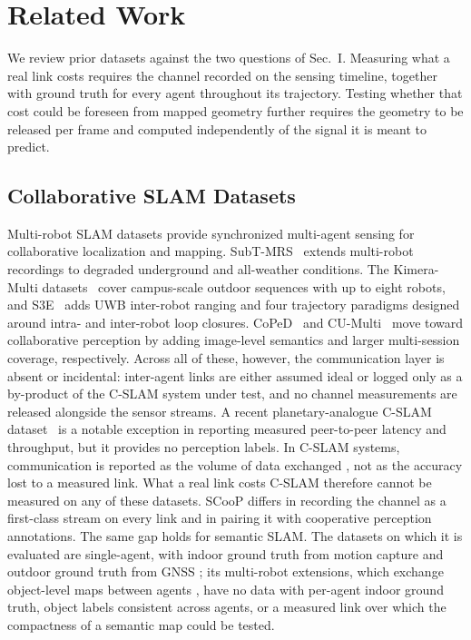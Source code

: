 \documentclass[conference]{IEEEtran}
\begin{document}
\section{Related Work}
\label{sec:related}
We review prior datasets against the two questions of Sec.~I. Measuring
what a real link costs requires the channel recorded on the sensing
timeline, together with ground truth for every agent throughout its
trajectory. Testing whether that cost could be foreseen from mapped
geometry further requires the geometry to be released per frame and
computed independently of the signal it is meant to predict.

\subsection{Collaborative SLAM Datasets}
Multi-robot SLAM datasets provide synchronized multi-agent sensing for
collaborative localization and mapping.
SubT-MRS~\cite{subtmrs} extends multi-robot recordings to degraded
underground and all-weather conditions. The Kimera-Multi
datasets~\cite{kimeramulti} cover campus-scale outdoor sequences
with up to eight robots, and S3E~\cite{s3e} adds UWB inter-robot
ranging and four trajectory paradigms designed around intra- and
inter-robot loop closures. CoPeD~\cite{coped} and
CU-Multi~\cite{cumulti} move toward collaborative perception by
adding image-level semantics and larger multi-session coverage,
respectively. Across all of these, however, the communication layer
is absent or incidental: inter-agent links are either assumed ideal or
logged only as a by-product of the C-SLAM system under test, and no
channel measurements are released alongside the sensor streams. A
recent planetary-analogue C-SLAM dataset~\cite{planetary_cslam} is a
notable exception in reporting measured peer-to-peer latency and
throughput, but it provides no perception labels. In C-SLAM systems, communication is reported as the volume of
data exchanged \cite{doorslam,swarmslam}, not as the accuracy lost to
a measured link. What a real link costs C-SLAM therefore cannot be
measured on any of these datasets. SCooP differs in
recording the channel as a first-class stream on every link and in
pairing it with cooperative perception annotations. The same gap holds for semantic SLAM. The datasets on which it is
evaluated are single-agent, with indoor ground truth from motion
capture and outdoor ground truth from GNSS \cite{semslam_survey}; its
multi-robot extensions, which exchange object-level maps between
agents \cite{kimeramulti}, have no data with per-agent indoor ground
truth, object labels consistent across agents, or a measured link over
which the compactness of a semantic map could be tested.
\end{document}
